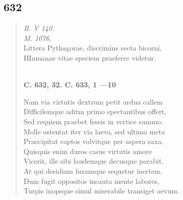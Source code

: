 \documentclass[11pt, a4paper]{report}
\begin{document}
            \subsection*{632}
      \begin{verse}
      \textit{B. V 140.} \\ \textit{M. 1076.} \\ Littera Pythagorae, discrimine secta bicorni, \\ HIumanae vitae speciem praeferre videtur. \\ 
        ﻿\pagebreak 
    \begin{center} \textbf{C. 632, 32. C. 633, 1 —10} \end{center} \marginpar{[99]} Nam via virtutis dextrum petit ardua callem \\ Difficilemque aditm primo spectantibus offert, \\ Sed requiem praebet fessis in vertice summo. \\ Molle ostentat iter via laeva, sed ultima meta \\ Praecipitat captos volvitque per aspera saxa. \\ Quisquis enim duros casus virtutis amore \\ Vicerit, ille sibi laudemque decusque parabit. \\ At qui desidiam luxumque sequetur inertem, \\ Dum fugit oppositos incauta mente labores, \\ Turpis inopsque simul miserabile transiget aevum. \\ 
      \end{verse}
  
\end{document}
